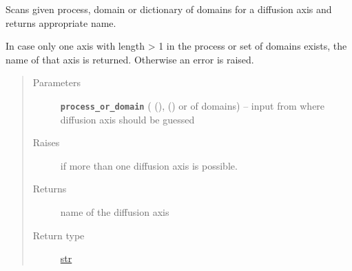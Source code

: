 \documentclass[a4paper,10pt,english]{sphinxmanual}
\begin{document}

\begin{fulllineitems}
\label{api/climlab.dynamics:climlab.dynamics.diffusion._guess_diffusion_axis}
Scans given process, domain or dictionary of domains for a diffusion axis
and returns appropriate name.

In case only one axis with length \textgreater{} 1 in the process or set of domains 
exists, the name of that axis is returned. Otherwise an error is raised.
\begin{quote}\begin{description}
\item[{Parameters}] \leavevmode
\textbf{\texttt{process\_or\_domain}} ({\hyperref[api/climlab.process:climlab.process.process.Process]{\emph{}}} (),
{\hyperref[api/climlab.domain:climlab.domain.domain._Domain]{\emph{}}} () or
\href{http://docs.python.org/2.7/library/stdtypes.html\#dict}{} of domains) -- input from where diffusion axis should be guessed

\item[{Raises}] \leavevmode
{} if more than one diffusion axis is possible.

\item[{Returns}] \leavevmode
name of the diffusion axis

\item[{Return type}] \leavevmode
\href{http://docs.python.org/2.7/library/functions.html\#str}{str}

\end{description}\end{quote}

\end{fulllineitems}

\end{document}
